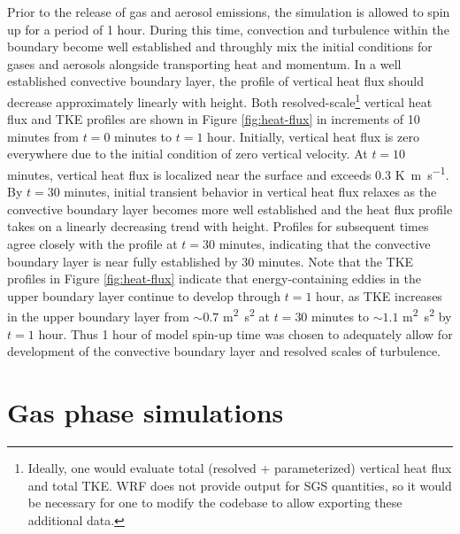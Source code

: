 Prior to the release of gas and aerosol emissions, the simulation is allowed to spin up for a period of 1 hour. During this time, convection and turbulence within the boundary become well established and throughly mix the initial conditions for gases and aerosols alongside transporting heat and momentum. In a well established convective boundary layer, the profile of vertical heat flux should decrease approximately linearly with height. Both resolved-scale\footnote{Ideally, one would evaluate total (resolved + parameterized) vertical heat flux and total TKE. WRF does not provide output for SGS quantities, so it would be necessary for one to modify the codebase to allow exporting these additional data.} vertical heat flux and TKE profiles are shown in Figure \ref{fig:heat-flux} in increments of 10 minutes from $t=0$ minutes to $t=1$ hour. Initially, vertical heat flux is zero everywhere due to the initial condition of zero vertical velocity. At $t=10$ minutes, vertical heat flux is localized near the surface and exceeds 0.3 \si{K.m.s^{-1}}. By $t=30$ minutes, initial transient behavior in vertical heat flux relaxes as the convective boundary layer becomes more well established and the heat flux profile takes on a linearly decreasing trend with height. Profiles for subsequent times agree closely with the profile at $t=30$ minutes, indicating that the convective boundary layer is near fully established by 30 minutes. Note that the TKE profiles in Figure  \ref{fig:heat-flux} indicate that energy-containing eddies in the upper boundary layer continue to develop through $t=1$ hour, as TKE increases in the upper boundary layer from $\sim 0.7$ \si{m^2.s^2} at $t=30$ minutes to $\sim 1.1$ \si{m^2.s^2} by $t=1$ hour. Thus 1 hour of model spin-up time was chosen to adequately allow for development of the convective boundary layer and resolved scales of turbulence.


\section{Gas phase simulations}

